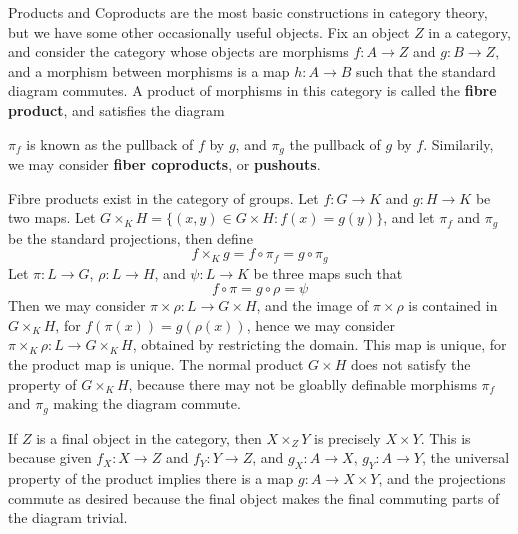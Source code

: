 Products and Coproducts are the most basic constructions in category theory, but we have some other occasionally useful objects. Fix an object $Z$ in a category, and consider the category whose objects are morphisms $f: A \to Z$ and $g: B \to Z$, and a morphism between morphisms is a map $h: A \to B$ such that the standard diagram commutes. A product of morphisms in this category is called the {\bf fibre product}, and satisfies the diagram
%
\begin{center}
\end{center}
%
$\pi_f$ is known as the pullback of $f$ by $g$, and $\pi_g$ the pullback of $g$ by $f$. Similarily, we may consider {\bf fiber coproducts}, or {\bf pushouts}.

\begin{example}
    Fibre products exist in the category of groups. Let $f: G \to K$ and $g: H \to K$ be two maps. Let $G \times_K H = \{ (x,y) \in G \times H : f(x) = g(y) \}$, and let $\pi_f$ and $\pi_g$ be the standard projections, then define
    \[ f \times_K g = f \circ \pi_f = g \circ \pi_g \]
    Let $\pi: L \to G$, $\rho: L \to H$, and $\psi: L \to K$ be three maps such that
    \[ f \circ \pi = g \circ \rho = \psi \]
    Then we may consider $\pi \times \rho: L \to G \times H$, and the image of $\pi \times \rho$ is contained in $G \times_K H$, for $f(\pi(x)) = g(\rho(x))$, hence we may consider $\pi \times_K \rho: L \to G \times_K H$, obtained by restricting the domain. This map is unique, for the product map is unique. The normal product $G \times H$ does not satisfy the property of $G \times_K H$, because there may not be gloablly definable morphisms $\pi_f$ and $\pi_g$ making the diagram commute.
\end{example}

\begin{example}
    If $Z$ is a final object in the category, then $X \times_Z Y$ is precisely $X \times Y$. This is because given $f_X: X \to Z$ and $f_Y: Y \to Z$, and $g_X: A \to X$, $g_Y: A \to Y$, the universal property of the product implies there is a map $g: A \to X \times Y$, and the projections commute as desired because the final object makes the final commuting parts of the diagram trivial.
\end{example}

